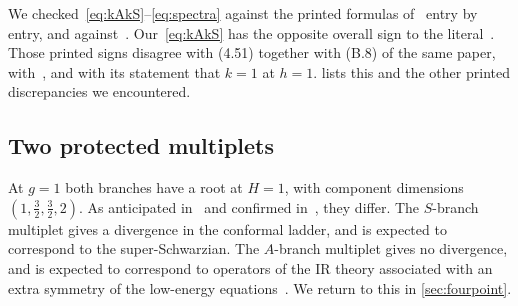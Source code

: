 We checked~\eqref{eq:kAkS}--\eqref{eq:spectra} against the printed formulas of~\cite{Peng:2017spg} entry by entry, and against~\cite{Fu:2016vas}. Our~\eqref{eq:kAkS} has the opposite overall sign to the literal~\cite[(4.48), (4.49)]{Bulycheva:2018qcp}. Those printed signs disagree with (4.51) together with (B.8) of the same paper, with~\cite{Peng:2017spg}, and with its statement that $k=1$ at $h=1$.  lists this and the other printed discrepancies we encountered.

\subsection{Two protected multiplets}

At $g=1$ both branches have a root at $H=1$, with component dimensions $(1,\tfrac32,\tfrac32,2)$. As anticipated in~\cite{Fu:2016vas} and confirmed in~\cite{Peng:2017spg}, they differ. The $S$-branch multiplet gives a divergence in the conformal ladder, and is expected to correspond to the super-Schwarzian. The $A$-branch multiplet gives no divergence, and is expected to correspond to operators of the IR theory associated with an extra symmetry of the low-energy equations~\cite[Sec.~VI]{Fu:2016vas}. We return to this in \cref{sec:fourpoint}.

